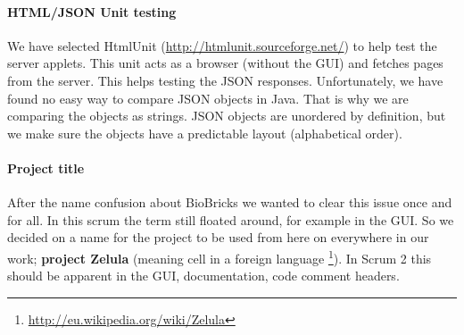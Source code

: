 \documentclass[a4paper]{article}
\begin{document}
\paragraph{HTML/JSON Unit testing}
We have selected HtmlUnit (\url{http://htmlunit.sourceforge.net/}) to help test the server applets. This unit acts as a browser (without the GUI) and fetches pages from the server. This helps testing the JSON responses. 
Unfortunately, we have found no easy way to compare JSON objects in Java. That is why we are comparing the objects as strings. JSON objects are unordered by definition, but we make sure the objects have a predictable layout (alphabetical order).

\paragraph{Project title}
After the name confusion about BioBricks we wanted to clear this issue once and for all. In this scrum the term still floated around, for example in the GUI. So we decided on a name for the project to be used from here on everywhere in our work; \textbf{project Zelula} (meaning cell in a foreign language \footnote{\url{http://eu.wikipedia.org/wiki/Zelula}}). In Scrum 2 this should be apparent in the GUI, documentation, code comment headers.
\end{document}
